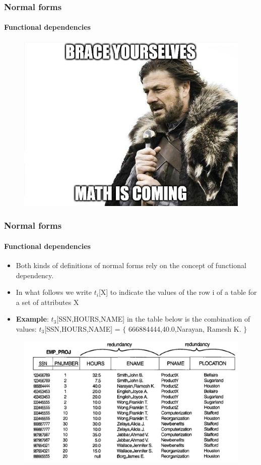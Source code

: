 \documentclass{beamer}
\newcommand{\valseq}[1]{$\lbrace$ #1 $\rbrace$}
\newcommand{\tuple}[2]{$t_{#1}$[#2]}
\begin{document}
\begin{frame}
	\frametitle{Normal forms}
	\framesubtitle{Functional dependencies}
	
	\begin{figure}
		\includegraphics[scale=0.75]{img/normalization/mathiscoming}
	\end{figure}
\end{frame}

\begin{frame}
	\frametitle{Normal forms}
	\framesubtitle{Functional dependencies}
	\begin{itemize}
		\item Both kinds of definitions of normal forms rely on the concept of functional dependency.
		\item In what follows we write \tuple{i}{X} to indicate the values of the row i of a table for a set of attributes X
		\item \textbf{Example}: \tuple{3}{SSN,HOURS,NAME} in the table below is the combination of values: 
		\tuple{3}{SSN,HOURS,NAME} = \valseq{666884444,40.0,Narayan, Ramesh K.}
	\end{itemize}
	
	\begin{figure}
		\includegraphics[scale=0.4]{img/normalization/norm5}
	\end{figure}
\end{frame}
\end{document}
